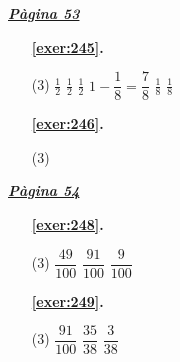 \hyperlink{page.53}{\textbf{\em Pàgina 53}}
\begin{enumerate}



 \item[\fontfamily{phv}\selectfont\color{blue}\textbf{\ref{exer:245}. }] \label{ans:245}
 \begin{tasks}[column-sep=1em, item-indent=1.3333em](3)
	 \task $\frac {1}{2}$
	 \task $\frac {1}{2}$
	 \task $\frac {1}{2}$
	 \task* $1-\dfrac {1}{8}=\dfrac {7}{8}$
	 \task $\frac {1}{8}$
	 \task $\frac {1}{8}$
\end{tasks}
 \end{enumerate}
\begin{enumerate}



 \item[\fontfamily{phv}\selectfont\color{blue}\textbf{\ref{exer:246}. }] \label{ans:246}
 \begin{tasks}[column-sep=1em, item-indent=1.3333em](3)
\end{tasks}
 \end{enumerate}
\vspace{0.3cm}


\hyperlink{page.54}{\textbf{\em Pàgina 54}}
\begin{enumerate}



 \item[\fontfamily{phv}\selectfont\color{blue}\textbf{\ref{exer:248}. }] \label{ans:248}
 \begin{tasks}[column-sep=1em, item-indent=1.3333em](3)
	 \task $\dfrac {49}{100}$
	 \task $\dfrac {91}{100}$
	 \task $\dfrac {9}{100}$
\end{tasks}
 \end{enumerate}
\begin{enumerate}



 \item[\fontfamily{phv}\selectfont\color{blue}\textbf{\ref{exer:249}. }] \label{ans:249}
 \begin{tasks}[column-sep=1em, item-indent=1.3333em](3)
	 \task $\dfrac {91}{100}$
	 \task $\dfrac {35}{38}$
	 \task $\dfrac {3}{38}$
\end{tasks}
 \end{enumerate}
\vspace{0.3cm}

